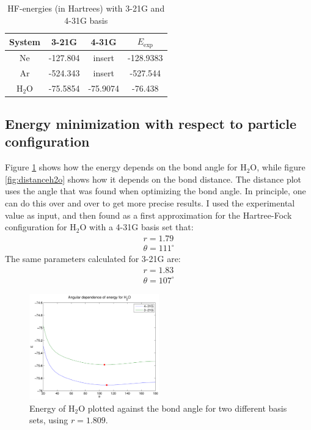 \documentclass[a4paper,10pt, twocolumn, pre]{revtex4}
\begin{document}
\begin{table}[h!tb]
\caption{HF-energies (in Hartrees) with 3-21G and 4-31G basis}
\label{tb:energy321g431g}
\begin{tabular}[c]{c|c|c|c}
System & 3-21G & 4-31G & $E_{\mbox{exp}}$ \\
\hline
Ne & -127.804 & insert & -128.9383 \\
Ar & -524.343 &insert & -527.544 \\
$\mbox{H}_2\mbox{O}$ & -75.5854 & -75.9074 & -76.438 \\
\end{tabular}
\end{table}

\subsection{Energy minimization with respect to particle configuration}
Figure \ref{fig:eangularh2o} shows how the energy depends on the bond angle for H$_2$O, while figure \ref{fig:distanceh2o} shows how it depends on the bond distance. The distance plot uses the angle that was found when optimizing the bond angle. In principle, one can do this over and over to get more precise results. I used the experimental value as input, and then found as a first approximation for the Hartree-Fock configuration for H$_2$O with a 4-31G basis set that:
\begin{align}
r = 1.79 \\
\theta = 111^{\circ}
\end{align}
The same parameters calculated for 3-21G are:
\begin{align}
r =  1.83\\
\theta = 107^{\circ}
\end{align}
\begin{figure}
\includegraphics[width=0.5\textwidth]{figures/H2O_angular_energy.pdf}
\caption{Energy of H$_2$O plotted against the bond angle for two different basis sets, using $r=1.809$.}
\label{fig:eangularh2o}
\end{figure}
\end{document}
